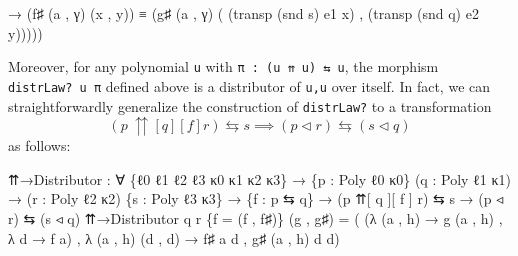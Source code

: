 \documentclass[
  11pt,
  oneside,
  article]{memoir}
\newenvironment{Shaded}{}{}
\newcommand{\NormalTok}[1]{#1}
\newcommand{\OtherTok}[1]{\textcolor[rgb]{0.00,0.44,0.13}{#1}}
\theoremstyle{definition}
\theoremstyle{plain}
\newcommand{\0}{\textsf{0}}
\newcommand{\1}{\tn{\textsf{1}}}
\begin{document}
\begin{Shaded}
\begin{Highlighting}[]
                            \OtherTok{→} \OtherTok{(}\NormalTok{f♯ }\OtherTok{(}\NormalTok{a , γ}\OtherTok{)} \OtherTok{(}\NormalTok{x , y}\OtherTok{))} 
\NormalTok{                              ≡ }\OtherTok{(}\NormalTok{g♯ }\OtherTok{(}\NormalTok{a , γ}\OtherTok{)} 
                                    \OtherTok{(} \OtherTok{(}\NormalTok{transp }\OtherTok{(}\NormalTok{snd s}\OtherTok{)}\NormalTok{ e1 x}\OtherTok{)} 
\NormalTok{                                    , }\OtherTok{(}\NormalTok{transp }\OtherTok{(}\NormalTok{snd q}\OtherTok{)}\NormalTok{ e2 y}\OtherTok{)))))}
\end{Highlighting}
\end{Shaded}

Moreover, for any polynomial \texttt{u} with
\texttt{π\ :\ (u\ ⇈\ u)\ ⇆\ u}, the morphism \texttt{distrLaw?\ u\ π}
defined above is a distributor of \texttt{u,u} over itself. In fact, we
can straightforwardly generalize the construction of \texttt{distrLaw?}
to a transformation \[
(p ~{\upuparrows}[q][f] r) \leftrightarrows s \implies (p \triangleleft r) \leftrightarrows (s \triangleleft q)
\] as follows:

\begin{Shaded}
\begin{Highlighting}[]
\NormalTok{⇈→Distributor }\OtherTok{:} \OtherTok{∀} \OtherTok{\{}\NormalTok{ℓ0 ℓ1 ℓ2 ℓ3 κ0 κ1 κ2 κ3}\OtherTok{\}}
                \OtherTok{→} \OtherTok{\{}\NormalTok{p }\OtherTok{:}\NormalTok{ Poly ℓ0 κ0}\OtherTok{\}} \OtherTok{(}\NormalTok{q }\OtherTok{:}\NormalTok{ Poly ℓ1 κ1}\OtherTok{)}
                \OtherTok{→} \OtherTok{(}\NormalTok{r }\OtherTok{:}\NormalTok{ Poly ℓ2 κ2}\OtherTok{)} \OtherTok{\{}\NormalTok{s }\OtherTok{:}\NormalTok{ Poly ℓ3 κ3}\OtherTok{\}}
                \OtherTok{→} \OtherTok{\{}\NormalTok{f }\OtherTok{:}\NormalTok{ p ⇆ q}\OtherTok{\}}
                \OtherTok{→} \OtherTok{(}\NormalTok{p ⇈[ q ][ f ] r}\OtherTok{)}\NormalTok{ ⇆ s}
                \OtherTok{→} \OtherTok{(}\NormalTok{p ◃ r}\OtherTok{)}\NormalTok{ ⇆ }\OtherTok{(}\NormalTok{s ◃ q}\OtherTok{)}
\NormalTok{⇈→Distributor q r }\OtherTok{\{}\NormalTok{f }\OtherTok{=} \OtherTok{(}\NormalTok{f , f♯}\OtherTok{)\}} \OtherTok{(}\NormalTok{g , g♯}\OtherTok{)} \OtherTok{=}
    \OtherTok{(} \OtherTok{(λ} \OtherTok{(}\NormalTok{a , h}\OtherTok{)} \OtherTok{→}\NormalTok{ g }\OtherTok{(}\NormalTok{a , h}\OtherTok{)}\NormalTok{ , }\OtherTok{λ}\NormalTok{ d\textquotesingle{} }\OtherTok{→}\NormalTok{ f a}\OtherTok{)} 
\NormalTok{    , }\OtherTok{λ} \OtherTok{(}\NormalTok{a , h}\OtherTok{)} \OtherTok{(}\NormalTok{d\textquotesingle{} , d}\OtherTok{)}
        \OtherTok{→}\NormalTok{ f♯ a d , g♯ }\OtherTok{(}\NormalTok{a , h}\OtherTok{)}\NormalTok{ d\textquotesingle{} d}\OtherTok{)}
\end{Highlighting}
\end{Shaded}
\end{document}
